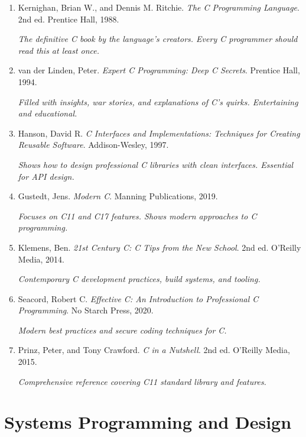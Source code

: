 \documentclass[11pt,openany]{book}
\begin{document}
\begin{enumerate}
    \item Kernighan, Brian W., and Dennis M. Ritchie. \textit{The C Programming Language}. 2nd ed. Prentice Hall, 1988.

    \textit{The definitive C book by the language's creators. Every C programmer should read this at least once.}

    \item van der Linden, Peter. \textit{Expert C Programming: Deep C Secrets}. Prentice Hall, 1994.

    \textit{Filled with insights, war stories, and explanations of C's quirks. Entertaining and educational.}

    \item Hanson, David R. \textit{C Interfaces and Implementations: Techniques for Creating Reusable Software}. Addison-Wesley, 1997.

    \textit{Shows how to design professional C libraries with clean interfaces. Essential for API design.}

    \item Gustedt, Jens. \textit{Modern C}. Manning Publications, 2019.

    \textit{Focuses on C11 and C17 features. Shows modern approaches to C programming.}

    \item Klemens, Ben. \textit{21st Century C: C Tips from the New School}. 2nd ed. O'Reilly Media, 2014.

    \textit{Contemporary C development practices, build systems, and tooling.}

    \item Seacord, Robert C. \textit{Effective C: An Introduction to Professional C Programming}. No Starch Press, 2020.

    \textit{Modern best practices and secure coding techniques for C.}

    \item Prinz, Peter, and Tony Crawford. \textit{C in a Nutshell}. 2nd ed. O'Reilly Media, 2015.

    \textit{Comprehensive reference covering C11 standard library and features.}
\end{enumerate}

\section*{Systems Programming and Design}
\end{document}
